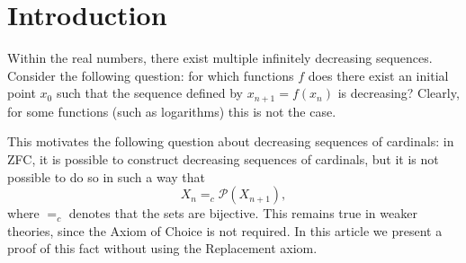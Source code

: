 \section*{Introduction}

Within the real numbers, there exist multiple infinitely decreasing sequences. Consider the following question: for which functions \(f\) does there exist an initial point \(x_0\) such that the sequence defined by \(x_{n+1} = f(x_n)\) is decreasing? Clearly, for some functions (such as logarithms) this is not the case.

This motivates the following question about decreasing sequences of cardinals: in ZFC, it is possible to construct decreasing sequences of cardinals, but it is not possible to do so in such a way that
\[
X_n =_c \mathcal{P}(X_{n+1}),
\]
where $=_c$ denotes that the sets are bijective. This remains true in weaker theories, since the Axiom of Choice is not required. In this article we present a proof of this fact without using the Replacement axiom.
